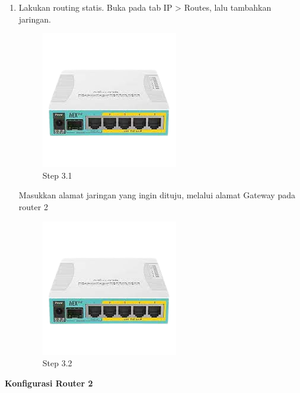 \begin{enumerate}
	\item Lakukan routing statis. Buka pada tab IP > Routes, lalu tambahkan jaringan.
	\begin{figure}[H]
		\centering
		\includegraphics[width=0.5\linewidth]{P1/img/contoh.png}
		\caption{Step 3.1}
		\label{fig:gambar3}
	\end{figure}

	Masukkan alamat jaringan yang ingin dituju, melalui alamat Gateway pada router 2
	
	\begin{figure}[H]
		\centering
		\includegraphics[width=0.5\linewidth]{P1/img/contoh.png}
		\caption{Step 3.2}
		\label{fig:gambar4}
	\end{figure}

\end{enumerate}

\begin{center} 
	\textbf{Konfigurasi Router 2}
\end{center}

